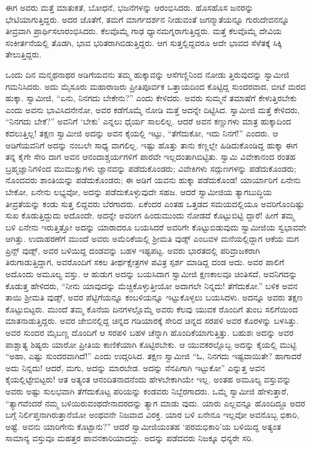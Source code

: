 ಈಗ ಅವರು ಮತ್ತೆ ಮಾತುಕತೆ, ಬೋಧನೆ, ಭಜನೆಗಳನ್ನು ಆರಂಭಿಸಿದರು. ಹೊಸಹೊಸ ಜನರನ್ನು ಭೇಟಿಯಾಗುತ್ತಿದ್ದರು. ಅದರ ಜೊತೆಗೆ, ತಮಗೆ ಮಾರ್ಗದರ್ಶನ ನೀಡುವಂತೆ ಜಗನ್ಮಾತೆಯನ್ನೂ ಗುರುದೇವನನ್ನೂ ತೀವ್ರವಾಗಿ ಪ್ರಾರ್ಥಿಸಲಾರಂಭಿಸಿದರು. ಕೆಲವೊಮ್ಮೆ ಗಾಢ ಧ್ಯಾನಮಗ್ನರಾಗುತ್ತಿದ್ದರು. ಮತ್ತೆ ಕೆಲವೊಮ್ಮೆ ದೇವಿಯ ಸಂಕೀರ್ತನೆಯಲ್ಲಿ ತೊಡಗಿ, ಭಾವ ಭರಿತರಾಗಿಬಿಡುತ್ತಿದ್ದರು. ಆಗ ಸುತ್ತಲ್ಲಿದ್ದವರೂ ಅದೇ ಭಾವದ ಸೆಳೆತಕ್ಕೆ ಸಿಕ್ಕಿ ತೇಲುತ್ತಿದ್ದರು.

ಒಂದು ದಿನ ಮನ್ಮಥನಾಥರ ಅಡಿಗೆಯವನು ತಮ್ಮ ಹುಕ್ಕಾವನ್ನು ಆಸೆಗಣ್ಣಿನಿಂದ ನೋಡು ತ್ತಿರುವುದನ್ನು ಸ್ವಾಮೀಜಿ ಗಮನಿಸಿದರು. ಅದು ಮೈಸೂರು ಮಹಾರಾಜರು ಪ್ರೀತಿಪೂರ್ವಕ ಒತ್ತಾಯದಿಂದ ಕೊಟ್ಟಿದ್ದ ಸುಂದರವಾದ, ಬೀಟೆ ಮರದ ಹುಕ್ಕಾ. ಸ್ವಾಮೀಜಿ, “ಏನು, ನಿನಗದು ಬೇಕೇನು?” ಎಂದು ಕೇಳಿದರು. ಅವರು ಸುಮ್ಮನೆ ತಮಾಷೆಗೆ ಕೇಳುತ್ತಿರಬೇಕು ಎಂದು ಅವನು ಭಾವಿಸಿದನೇನೋ, ಅವರ ಕಡೆಗೊಮ್ಮೆ ನೋಡಿ ಮತ್ತೆ ಅದನ್ನೇ ದಿಟ್ಟಿಸಿದ. ಸ್ವಾಮೀಜಿ ಮತ್ತೆ ಕೇಳಿದರು, “ನಿನಗದು ಬೇಕೆ?” ಅವನಿಗೆ ‘ಬೇಕು’ ಎನ್ನಲು ಧೈರ್ಯ ಸಾಲಲಿಲ್ಲ. ಆದರೆ ಅವನ ಕಣ್ಣುಗಳು ಮಾತ್ರ ಹುಕ್ಕಾದಿಂದ ಕದಲುತ್ತಿಲ್ಲ! ತಕ್ಷಣ ಸ್ವಾಮೀಜಿ ಅದನ್ನು ಅವನ ಕೈಯಲ್ಲಿ ಇಟ್ಟು, “ತೆಗೆದುಕೋ, ಇದು ನಿನಗೆ!” ಎಂದರು. ಆ ಅಡಿಗೆಯವನಿಗೆ ಅದನ್ನು ನಂಬಲೇ ಸಾಧ್ಯ ವಾಗಲಿಲ್ಲ. ಇಷ್ಟು ಹೊತ್ತು ತಾನು ಕಣ್ಣಲ್ಲೇ ಹಿಡಿದುಕೊಂಡಿದ್ದ ಹುಕ್ಕಾ ಈಗ ತನ್ನ ಕೈಗೇ ಸೇರಿ ದಾಗ ಅವನ ಆನಂದಾಶ್ಚರ್ಯಗಳಿಗೆ ಪಾರವೇ ಇಲ್ಲದಂತಾಗಿಬಿಟ್ಟಿತು. ಸ್ವಾಮಿ ವಿವೇಕಾನಂದ ರಂತಹ ಬ್ರಹ್ಮಜ್ಞಾನಿಗಳಿಂದ ಮುಮುಕ್ಷುಗಳು ಜ್ಞಾನವನ್ನು ಪಡೆದುಕೊಂಡರು; ವಿವೇಕಿಗಳು ಸದ್ಗುಣಗಳನ್ನು ಪಡೆದುಕೊಂಡರು; ನೊಂದವರು ಶಾಂತಿಯನ್ನು ಪಡೆದುಕೊಂಡರು; ಈ ಅಡಿಗೆ ಯವನು ಹುಕ್ಕಾ ಪಡೆದುಕೊಂಡ! ಯಾರ್ಯಾರಿಗೆ ಏನೇನು ಬೇಕೋ, ಏನೇನು ಲಭ್ಯವೋ, ಅದನ್ನು ಪಡೆದುಕೊಳ್ಳುವುದೇ ಸಹಜ. ಆದರೆ ಸ್ವಾಮೀಜಿಯ ತ್ಯಾಗಬುದ್ಧಿಯ ತೀವ್ರತೆಯನ್ನು ಕಂಡು ಸುತ್ತ ಲಿದ್ದವರು ಬೆರಗಾದರು. ಏಕೆಂದರ ಎಂತಹ ಒತ್ತಡದ ಸಮಯದಲ್ಲಿಯೂ ಅವರಿಗೊಂದಿಷ್ಟು ಸುಖ ಕೊಡುತ್ತಿದ್ದುದು ಅದೊಂದೇ. ಅದನ್ನೇ ಅವರೀಗ ಹಿಂದುಮುಂದು ನೋಡದೆ ಕೊಟ್ಟುಬಿಟ್ಟಿ ದ್ದಾರೆ! ಹೀಗೆ ತಮ್ಮ ಬಳಿ ಏನೇನು ಇರುತ್ತಿತ್ತೋ ಅದನ್ನು ಯಾರಾದರೂ ಬಯಸಿದರೆ ಅವರಿಗೇ ಕೊಟ್ಟುಬಿಡುವುದು ಸ್ವಾಮೀಜಿಯ ಸ್ವಭಾವವೇ ಆಗಿತ್ತು. ಉದಾಹರಣೆಗೆ ಮುಂದೆ ಅವರು ಅಮೆರಿಕೆಯಲ್ಲಿ ಶ್ರೀಮತಿ ವುಡ್ಸ್ ಎಂಬವಳ ಮನೆಯಲ್ಲಿದ್ದಾಗ ಆಕೆಯ ಮಗ ಪ್ರಿನ್ಸ್ ವುಡ್ಸ್, ಅವರ ಬಳಿಯಿದ್ದ ದಂಡವನ್ನು ಬಹಳ ಇಷ್ಟಪಟ್ಟ. ಅವರು ಭಾರತದಲ್ಲಿ ಪರಿವ್ರಾಜಕರಾಗಿ ತಿರುಗಾಡುತ್ತಿದ್ದಾಗ, ಅವರೊಂದಿಗೆ ಸಕಲ ತೀರ್ಥಕ್ಷೇತ್ರಗಳ ಪವಿತ್ರ ಸ್ಪರ್ಶ ಮಾಡಿದ್ದ ದಂಡ ಅದು. ಅವರ ಪಾಲಿಗೆ ಅದೊಂದು ಅಮೂಲ್ಯ ವಸ್ತು. ಆ ಹುಡುಗ ಅದನ್ನು ಬಯಸಿದಾಗ ಸ್ವಾಮೀಜಿ ಕ್ಷಣಕಾಲವೂ ಚಿಂತಿಸದೆ, ಅವನಿಗದನ್ನು ಕೊಡುತ್ತ ಹೇಳಿದರು, “ನೀನು ಯಾವುದನ್ನು ಮೆಚ್ಚಿಕೊಳ್ಳುತ್ತೀಯೋ ಅದಾಗಲೇ ನಿನ್ನದು! ತೆಗೆದುಕೋ.” ಬಳಿಕ ಅವನ ತಾಯಿ ಶ್ರೀಮತಿ ವುಡ್ಸ್, ಅವರ ಪೆಟ್ಟಿಗೆಯನ್ನೂ ಕಂಬಳಿಯನ್ನೂ ಇಟ್ಟುಕೊಳ್ಳಲು ಬಯಸಿದಳು. ಅದನ್ನೂ ಅವರು ತಕ್ಷಣ ಕೊಟ್ಟುಬಿಟ್ಟರು. ಮುಂದೆ ತಮ್ಮ ಕೊನೆಯ ದಿನಗಳಲ್ಲೊಮ್ಮೆ ಅವರು ಕೆಲವು ಯುವಕ ರೊಂದಿಗೆ ತುಂಬ ಸಲಿಗೆಯಿಂದ ಮಾತನಾಡುತ್ತಿದ್ದರು. ಅವರ ಜೇಬಿನಲ್ಲಿದ್ದ ಚಿನ್ನದ ಗಡಿಯಾರಕ್ಕೆ ಸೇರಿದ ಚಿನ್ನದ ಸರಪಳಿ ಅವರ ಕೊರಳನ್ನು ಬಳಸಿತ್ತು. ಅವರ ಸುಂದರ ಮೈಬಣ್ಣ ದೊಂದಿಗೆ ಆ ಸರಪಳಿ ಬಹಳ ಚೆನ್ನಾಗಿ ಹೊಂದಿಕೆಯಾಗುತ್ತಿತ್ತು. ಬಹುಶಃ ಅದನ್ನು ಅವರ ಪಾಶ್ಚಾತ್ಯ ಶಿಷ್ಯರು ಯಾರೋ ಪ್ರೀತಿಯ ಕಾಣಿಕೆಯಾಗಿ ಕೊಟ್ಟಿರಬೇಕು. ಆ ಯುವಕರಲ್ಲೊಬ್ಬ ಅದನ್ನು ಕೈಯಲ್ಲಿ ಮುಟ್ಟಿ “ಅಹಾ, ಎಷ್ಟು ಸುಂದರವಾಗಿದೆ!” ಎಂದು ಉದ್ಗರಿಸಿದ. ತಕ್ಷಣ ಸ್ವಾಮೀಜಿ “ಓ, ನಿನಗದು ಇಷ್ಟವಾಯಿತೇ? ಹಾಗಾದರೆ ಅದು ನಿನ್ನದು! ಆದರೆ, ಮಗು, ಅದನ್ನು ಮಾರಬೇಡ. ಅದನ್ನು ನೆನಪಿಗಾಗಿ ಇಟ್ಟುಕೋ” ಎನ್ನುತ್ತ ಅವನ ಕೈಯಲ್ಲಿಟ್ಟೇಬಿಟ್ಟರು! ಆತ ಅತ್ಯಂತ ಆನಂದಿತನಾದನೆಂದು ಹೇಳಬೇಕಾಗಿಯೇ ಇಲ್ಲ. ಅಂತಹ ಅಮೂಲ್ಯ ವಸ್ತುವನ್ನು ಅವರು ಅಷ್ಟು ಸುಲಭವಾಗಿ ತೆಗೆದುಕೊಟ್ಟ ಪರಿಯನ್ನು ಕಂಡವರು ನಿಬ್ಬೆರಗಾದರು. ಒಮ್ಮೆ ಸ್ವಾಮೀಜಿ ಹೇಳುತ್ತಾರೆ, “ತ್ಯಾಗವೆಂದರೆ ನಮ್ಮ ಬಳಿಯಿರುವಂಥದೇನಾದರದನ್ನು ತ್ಯಾಗ ಮಾಡು ವುದು. ಯಾರು ಎಲ್ಲವನ್ನೂ ಹೊಂದಿದ್ದೂ ಅದರ ಬಗ್ಗೆ ನಿರ್ಲಿಪ್ತನಾಗಿರುತ್ತಾನೆಯೋ ಅಂಥವನೇ ನಿಜವಾದ ವಿರಕ್ತ. ಯಾರ ಬಳಿ ಏನೇನೂ ಇಲ್ಲವೋ ಅವನೊಬ್ಬ ಭಿಕಾರಿ, ಅಷ್ಟೆ. ಅವನು ಯಾರಿಗೇನು ಕೊಟ್ಟಾನು?” ಆದರೆ ಸ್ವಾಮೀಜಿಯಂತಹ ‘ಪರಮಭಿಕಾರಿ’ಯ ಬಳಿಯಿದ್ದ ಅತ್ಯಂತ ಸಾಮಾನ್ಯ ವಸ್ತುವೂ ಮಹತ್ತರ ಪಾವನಕಾರಿಯಾದದ್ದು. ಅದನ್ನು ಪಡೆದವರು ನಿಜಕ್ಕೂ ಧನ್ಯರೇ ಸರಿ.

